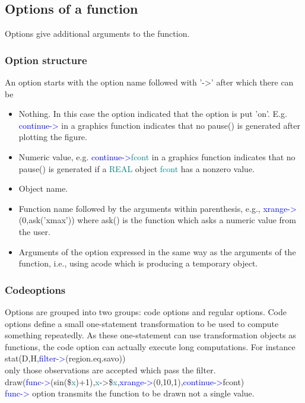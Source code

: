 {\subsection{Options of a function} 
\label{options} 
Options give additional arguments to the function. 
\subsubsection{Option structure} 
\label{optionstructure} 
An option starts with the option name 
followed with '->' after which there can be 
\begin{itemize} 
\item Nothing. In this case the option indicated that the option is put 'on'. E.g. 
\textcolor{blue}{continue->} in a graphics function indicates that no \textcolor{VioletRed}{pause}() is generated after plotting the figure. 
\item Numeric value, e.g. \textcolor{blue}{continue->}\textcolor{teal}{fcont} in a graphics function 
indicates that no \textcolor{VioletRed}{pause}() is generated if a \textcolor{teal}{REAL} object \textcolor{teal}{fcont} has a nonzero value. 
 
\item Object name. 
\item Function name followed by the arguments within parenthesis, e.g., 
\textcolor{blue}{xrange->}(0,\textcolor{VioletRed}{ask}('xmax')) where \textcolor{VioletRed}{ask}() is the function which asks a numeric value from the user. 
\item Arguments of the option expressed in the same way as the arguments of the function, i.e., 
using acode which is producing a temporary object. 
\end{itemize} 
\subsubsection{Codeoptions} 
\label{codeoption} 
Options are grouped into two groups: code options and regular options. 
Code options 
define a small one-statement transformation to be used to compute something repeatedly. 
As these one-statement can use transformation objects as functions, the code option can actually 
execute long computations. For instance \\ 
\textcolor{VioletRed}{stat}(D,H,\textcolor{blue}{filter->}(region.eq.savo)) \\ 
only those observations are accepted which pass the filter.\\ 
\textcolor{VioletRed}{draw}(\textcolor{blue}{func->}(\textcolor{VioletRed}{sin}(\$\textcolor{teal}{x})+1),\textcolor{teal}{x}->\$\textcolor{teal}{x},\textcolor{blue}{xrange->}(0,10,1),\textcolor{blue}{continue->}fcont)\\ 
\textcolor{blue}{func->} option 
transmits the function to be drawn not a single value. 
}
